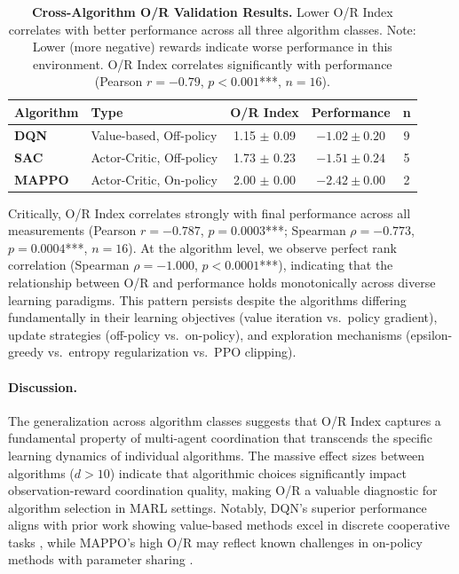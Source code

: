 \begin{table}[H]
\centering
\caption{\textbf{Cross-Algorithm O/R Validation Results.} Lower O/R Index correlates with better performance across all three algorithm classes. Note: Lower (more negative) rewards indicate worse performance in this environment. O/R Index correlates significantly with performance (Pearson $r = -0.79$, $p < 0.001$***, $n=16$).}
\label{tab:cross_algorithm}
\begin{tabular}{llccc}
\toprule
\textbf{Algorithm} & \textbf{Type} & \textbf{O/R Index} & \textbf{Performance} & \textbf{n} \\
\midrule
\textbf{DQN} & Value-based, Off-policy & 1.15 $\pm$ 0.09 & $-1.02 \pm 0.20$ & 9 \\
\textbf{SAC} & Actor-Critic, Off-policy & 1.73 $\pm$ 0.23 & $-1.51 \pm 0.24$ & 5 \\
\textbf{MAPPO} & Actor-Critic, On-policy & 2.00 $\pm$ 0.00 & $-2.42 \pm 0.00$ & 2 \\
\bottomrule
\end{tabular}
\end{table}

Critically, O/R Index correlates strongly with final performance across all measurements (Pearson $r = -0.787$, $p = 0.0003$***; Spearman $\rho = -0.773$, $p = 0.0004$***, $n=16$). At the algorithm level, we observe perfect rank correlation (Spearman $\rho = -1.000$, $p < 0.0001$***), indicating that the relationship between O/R and performance holds monotonically across diverse learning paradigms. This pattern persists despite the algorithms differing fundamentally in their learning objectives (value iteration vs.\ policy gradient), update strategies (off-policy vs.\ on-policy), and exploration mechanisms (epsilon-greedy vs.\ entropy regularization vs.\ PPO clipping).

\paragraph{Discussion.}
The generalization across algorithm classes suggests that O/R Index captures a fundamental property of multi-agent coordination that transcends the specific learning dynamics of individual algorithms. The massive effect sizes between algorithms ($d > 10$) indicate that algorithmic choices significantly impact observation-reward coordination quality, making O/R a valuable diagnostic for algorithm selection in MARL settings. Notably, DQN's superior performance aligns with prior work showing value-based methods excel in discrete cooperative tasks \citep{sunehag2017value}, while MAPPO's high O/R may reflect known challenges in on-policy methods with parameter sharing \citep{papoudakis2021benchmarking}.

